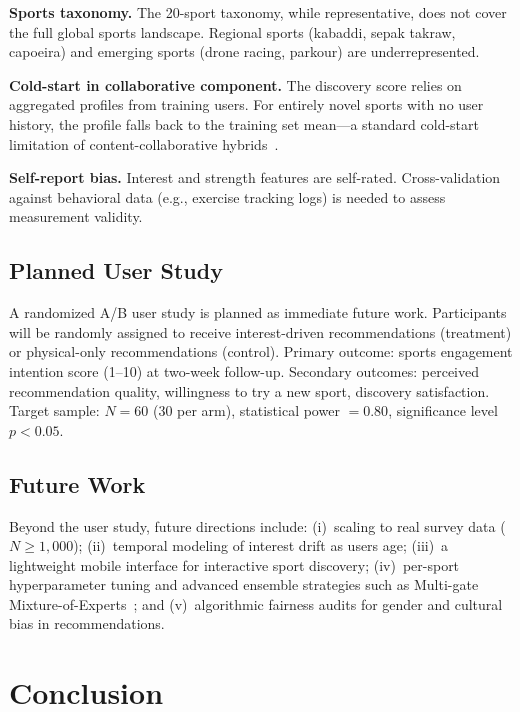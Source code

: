 \documentclass[conference]{IEEEtran}
\begin{document}
\noindent\textbf{Sports taxonomy.}
The 20-sport taxonomy, while representative, does not cover the full global
sports landscape. Regional sports (kabaddi, sepak takraw, capoeira) and
emerging sports (drone racing, parkour) are underrepresented.

\noindent\textbf{Cold-start in collaborative component.}
The discovery score relies on aggregated profiles from training users.
For entirely novel sports with no user history, the profile falls back to
the training set mean---a standard cold-start limitation of
content-collaborative hybrids~\cite{burke2002hybrid}.

\noindent\textbf{Self-report bias.}
Interest and strength features are self-rated. Cross-validation against
behavioral data (e.g., exercise tracking logs) is needed to assess
measurement validity.

\subsection{Planned User Study}

A randomized A/B user study is planned as immediate future work.
Participants will be randomly assigned to receive interest-driven
recommendations (treatment) or physical-only recommendations (control).
Primary outcome: sports engagement intention score (1--10) at two-week
follow-up. Secondary outcomes: perceived recommendation quality,
willingness to try a new sport, discovery satisfaction.
Target sample: $N = 60$ (30 per arm), statistical power $= 0.80$,
significance level $p < 0.05$.

\subsection{Future Work}

Beyond the user study, future directions include: (i)~scaling to real
survey data ($N \geq 1{,}000$); (ii)~temporal modeling of interest drift
as users age; (iii)~a lightweight mobile interface for interactive
sport discovery; (iv)~per-sport hyperparameter tuning and advanced
ensemble strategies such as Multi-gate Mixture-of-Experts~\cite{ma2018mmoe};
and (v)~algorithmic fairness audits for gender and cultural bias in
recommendations.

\section{Conclusion}
\label{sec:conclusion}
\end{document}
